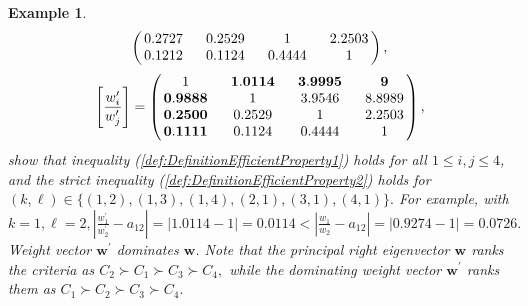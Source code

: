 \documentclass{article}
\theoremstyle{plain}
\newtheorem{example}{Example}[section]
\begin{document}
\begin{example}
\[\begin{pmatrix}
$\,$ 0.2727 $\,\,$ & $\,\,$ 0.2529 $\,\,$ & $\,\,$   1    $\,\,$ & $\,\,$ 2.2503 $\,$   \\
$\,$ 0.1212 $\,\,$ & $\,\,$ 0.1124 $\,\,$ & $\,\,$ 0.4444 $\,\,$ & $\,\,$   1    $\,$
\end{pmatrix},
\]
\[
\left[ \frac{{w}^{\prime}_i}{{w}^{\prime}_j} \right] =
\begin{pmatrix}
$\,$   1    $\,\,$ & $\,\,$   \mathbf{1.0114}    $\,\,$ & $\,\,$ \mathbf{3.9995} $\,\,$ & $\,\,$ \mathbf{9} $\,$    \\
$\,$   \mathbf{0.9888}    $\,\,$ & $\,\,$   1    $\,\,$ & $\,\,$ 3.9546 $\,\,$ & $\,\,$ 8.8989 $\,$    \\
$\,$ \mathbf{0.2500} $\,\,$ & $\,\,$ 0.2529 $\,\,$ & $\,\,$   1    $\,\,$ & $\,\,$ 2.2503 $\,$   \\
$\,$ \mathbf{0.1111} $\,\,$ & $\,\,$ 0.1124 $\,\,$ & $\,\,$ 0.4444 $\,\,$ & $\,\,$   1    $\,$
\end{pmatrix},
        \]
show that inequality (\ref{def:DefinitionEfficientProperty1})
holds for all $1\leq i,j \leq 4$, and the strict inequality
(\ref{def:DefinitionEfficientProperty2}) holds for $(k,\ell) \in
\{(1,2), (1,3), (1,4), (2,1), (3,1), (4,1)  \}.$
For example, with $k=1, \ell=2, |\frac{{w}^{\prime}_1}{{w}^{\prime}_2} - a_{12}|
= |1.0114 - 1 | =0.0114 < |\frac{{w}_1}{{w}_2} - a_{12}| = |0.9274 - 1| = 0.0726.$
Weight vector ${\mathbf{w}}^{\prime}$ dominates ${\mathbf{w}}$.
Note that the principal right eigenvector $\mathbf{w}$ ranks the criteria as
$C_2 \succ C_1 \succ C_3 \succ C_4,$ while the dominating weight
vector $\mathbf{w}^{\prime}$ ranks them as  $C_1 \succ C_2 \succ C_3 \succ C_4.$
\end{example}
\end{document}
